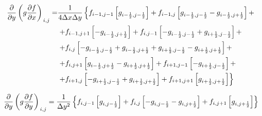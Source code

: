 \begin{equation*}
    \begin{split}
	    \left.
	        \frac
                {\partial }
                {\partial y}
	        \left(
	            g
	            \frac
	                {\partial f}
	                {\partial x}
	        \right)
        \right._{i, j}
	    = &
	    \frac
	        {1}
	        {4 \Delta x \Delta y}
	    \left\{
	        f_{i - 1, j - 1}
	        \left[
                g_{i - \onehalf, j - \onehalf}
            \right]
	        +
	        f_{i - 1, j}
	       \left[
	        	g_{i - \onehalf, j - \onehalf}
	        	- g_{i - \onehalf, j + \onehalf}
	        \right]
	        +
        \right.
        \\ &
        \left.
            +
            \newline
	        f_{i - 1, j + 1}
	        \left[
                - g_{i - \onehalf, j + \onehalf}
            \right]
	        +
	        f_{i, j-1}
	        \left[
                - g_{i - \onehalf, j - \onehalf}
                + g_{i + \onehalf, j - \onehalf}
	    	\right]
            +
        \right.
        \\ &
        \left.
            +
            f_{i, j}
	        \left[
                - g_{i - \onehalf, j - \onehalf}
                + g_{i - \onehalf, j + \onehalf}
                + g_{i + \onehalf, j - \onehalf}
                - g_{i + \onehalf, j + \onehalf}
            \right]
            +
        \right. 
        \\ &
        \left.
            +
            f_{i, j + 1}
            \left[
                  g_{i - \onehalf, j + \onehalf}
                - g_{i + \onehalf, j + \onehalf}
            \right]
            +
            f_{i + 1, j - 1}
            \left[
                - g_{i + \onehalf, j - \onehalf}
            \right]
            +
        \right.
        \\ &
        \left.
            +
            f_{i + 1, j}
            \left[
                - g_{i + \onehalf, j - \onehalf}
                + g_{i + \onehalf, j + \onehalf}
            \right]
            +
            f_{i + 1, j + 1}
            \left[
                  g_{i + \onehalf, j + \onehalf}
            \right]
        \right\}
    \end{split}
\end{equation*}

\begin{equation*}
	\left.
        \frac
	        {\partial }
	        {\partial y}
	    \left(
	        g
	    	\frac
	    	    {\partial f}
	    	    {\partial y}
	    \right)
	\right._{i, j}
	=
	\frac
	    {1}
	    {\Delta y^2}
	\left\{
	    f_{i, j - 1}
	    \left[
		    g_{i, j - \frac{1}{2}}
		\right]
	    +
	    f_{i,j}
	    \left[
		    - g_{i, j - \frac{1}{2}}
		    - g_{i, j + \frac{1}{2}}
	    \right]
	    +
	    f_{i,j + 1}
	    \left[
		    g_{i, j + \frac{1}{2}}
	    \right]
	\right\}
\end{equation*}

